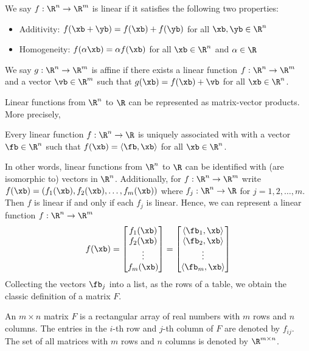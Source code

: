 \begin{definition}
We say $f: \R^n \to \R^m$ is linear if it satisfies the following two properties:
\begin{itemize}
    \item Additivity: $f(\xb + \yb) = f(\xb) + f(\yb)$ for all $\xb, \yb \in \R^n$
    \item Homogeneity: $f(\alpha \xb) = \alpha f(\xb)$ for all $\xb \in \R^n$ and $\alpha \in \R$
\end{itemize}
We say $g: \R^n \to \R^m$ is affine if there exists a linear function $f: \R^n \to \R^m$ and a vector $\vb \in \R^m$ such that $g(\xb) = f(\xb) + \vb$ for all $\xb \in \R^n$.
\end{definition}

Linear functions from $\R^n$ to $\R$ can be represented as matrix-vector products. More precisely, 
\begin{lemma}
Every linear function $f: \R^n \to \R$ is uniquely associated with 
   with a vector $\fb \in \R^n$ such that $f(\xb) = \langle \fb, \xb \rangle$ for all $\xb \in \R^n$. 
\end{lemma}
In other words, linear functions from $\R^n$ to $\R$ can be identified with (are isomorphic to) vectors in $\R^n$. Additionally, for $f: \R^n \to \R^m$ write $f(\xb) = (f_1(\xb), f_2(\xb), \ldots, f_m(\xb))$ where $f_j: \R^n \to \R$ for $j=1,2,\ldots,m$. Then $f$ is linear if and only if each $f_j$ is linear. Hence, we can represent a linear function $f: \R^n \to \R^m$ 
\begin{equation*}
    f(\xb) = \begin{bmatrix}
        f_1(\xb) \\
        f_2(\xb) \\
        \vdots \\
        f_m(\xb)
    \end{bmatrix} = 
    \begin{bmatrix}
        \langle \fb_1, \xb \rangle \\
        \langle \fb_2, \xb \rangle \\
        \vdots \\
        \langle \fb_m, \xb \rangle
    \end{bmatrix} 
\end{equation*}
Collecting the vectors $\fb_j$ into a list, as the rows of a table, we obtain 
the classic definition of a matrix $F$. 
\begin{definition}
    An $m \times n$ matrix $F$ is a rectangular array of real numbers with $m$ rows and $n$ columns. The entries in the $i$-th row and $j$-th column of $F$ are denoted by $f_{ij}$. The set of all matrices with $m$ rows and $n$ columns is denoted by $\R^{m \times n}$.
\end{definition}

